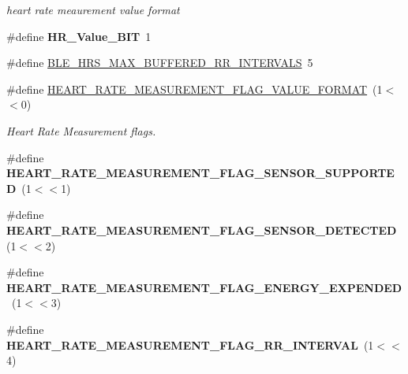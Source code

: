 \begin{DoxyCompactItemize}
\begin{DoxyCompactList}\small\item\em heart rate meaurement value format \end{DoxyCompactList}\item 
\#define {\bfseries H\+R\+\_\+\+Value\+\_\+B\+IT}~1\hypertarget{group___b_l_e___h_r_s_ga3e052810b42a02da0f92726d9bd62a75}{}\label{group___b_l_e___h_r_s_ga3e052810b42a02da0f92726d9bd62a75}

\item 
\#define \hyperlink{group___b_l_e___h_r_s_ga2e829f32fd9d57d18d1e8daa7956dee5}{B\+L\+E\+\_\+\+H\+R\+S\+\_\+\+M\+A\+X\+\_\+\+B\+U\+F\+F\+E\+R\+E\+D\+\_\+\+R\+R\+\_\+\+I\+N\+T\+E\+R\+V\+A\+LS}~5
\item 
\#define \hyperlink{group___b_l_e___h_r_s_ga962d8723c083e3fa82a4e4ee4a66b5ae}{H\+E\+A\+R\+T\+\_\+\+R\+A\+T\+E\+\_\+\+M\+E\+A\+S\+U\+R\+E\+M\+E\+N\+T\+\_\+\+F\+L\+A\+G\+\_\+\+V\+A\+L\+U\+E\+\_\+\+F\+O\+R\+M\+AT}~(1$<$$<$0)\hypertarget{group___b_l_e___h_r_s_ga962d8723c083e3fa82a4e4ee4a66b5ae}{}\label{group___b_l_e___h_r_s_ga962d8723c083e3fa82a4e4ee4a66b5ae}

\begin{DoxyCompactList}\small\item\em Heart Rate Measurement flags. \end{DoxyCompactList}\item 
\#define {\bfseries H\+E\+A\+R\+T\+\_\+\+R\+A\+T\+E\+\_\+\+M\+E\+A\+S\+U\+R\+E\+M\+E\+N\+T\+\_\+\+F\+L\+A\+G\+\_\+\+S\+E\+N\+S\+O\+R\+\_\+\+S\+U\+P\+P\+O\+R\+T\+ED}~(1$<$$<$1)\hypertarget{group___b_l_e___h_r_s_ga72578d725eecdd0a9de78558d45369b5}{}\label{group___b_l_e___h_r_s_ga72578d725eecdd0a9de78558d45369b5}

\item 
\#define {\bfseries H\+E\+A\+R\+T\+\_\+\+R\+A\+T\+E\+\_\+\+M\+E\+A\+S\+U\+R\+E\+M\+E\+N\+T\+\_\+\+F\+L\+A\+G\+\_\+\+S\+E\+N\+S\+O\+R\+\_\+\+D\+E\+T\+E\+C\+T\+ED}~(1$<$$<$2)\hypertarget{group___b_l_e___h_r_s_gae8c9d89f1d73bbc34280f89fc5e9cd14}{}\label{group___b_l_e___h_r_s_gae8c9d89f1d73bbc34280f89fc5e9cd14}

\item 
\#define {\bfseries H\+E\+A\+R\+T\+\_\+\+R\+A\+T\+E\+\_\+\+M\+E\+A\+S\+U\+R\+E\+M\+E\+N\+T\+\_\+\+F\+L\+A\+G\+\_\+\+E\+N\+E\+R\+G\+Y\+\_\+\+E\+X\+P\+E\+N\+D\+ED}~(1$<$$<$3)\hypertarget{group___b_l_e___h_r_s_ga7ab0777c1882beb636e3c71bcc18761f}{}\label{group___b_l_e___h_r_s_ga7ab0777c1882beb636e3c71bcc18761f}

\item 
\#define {\bfseries H\+E\+A\+R\+T\+\_\+\+R\+A\+T\+E\+\_\+\+M\+E\+A\+S\+U\+R\+E\+M\+E\+N\+T\+\_\+\+F\+L\+A\+G\+\_\+\+R\+R\+\_\+\+I\+N\+T\+E\+R\+V\+AL}~(1$<$$<$4)\hypertarget{group___b_l_e___h_r_s_ga935a2d2ebe942f455fba9e4dbfb0257d}{}\label{group___b_l_e___h_r_s_ga935a2d2ebe942f455fba9e4dbfb0257d}

\end{DoxyCompactItemize}
